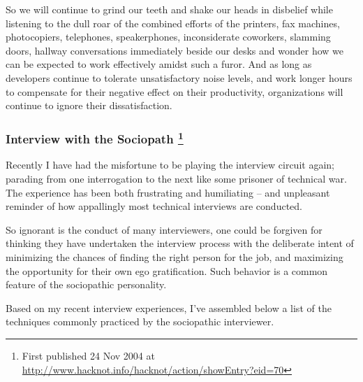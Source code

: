 \documentclass{article}
\begin{document}
\begin{enumerate}
So we will continue to grind our teeth and shake our heads in disbelief
while listening to the dull roar of the combined efforts of the
printers, fax machines, photocopiers, telephones, speakerphones,
inconsiderate coworkers, slamming doors, hallway conversations
immediately beside our desks and wonder how we can be expected to work
effectively amidst such a furor. And as long as developers continue to
tolerate unsatisfactory noise levels, and work longer hours to
compensate for their negative effect on their productivity,
organizations will continue to ignore their dissatisfaction.
\end{enumerate}

\subsubsection{Interview with the Sociopath  \footnote{First published 24 Nov 2004 at
\url{http://www.hacknot.info/hacknot/action/showEntry?eid=70}}}
\label{sec:orgheadline72}

Recently I have had the misfortune to be playing the interview circuit
again; parading from one interrogation to the next like some prisoner of
technical war. The experience has been both frustrating and humiliating
-- and unpleasant reminder of how appallingly most technical interviews
are conducted.

So ignorant is the conduct of many interviewers, one could be forgiven
for thinking they have undertaken the interview process with the
deliberate intent of minimizing the chances of finding the right person
for the job, and maximizing the opportunity for their own ego
gratification. Such behavior is a common feature of the sociopathic
personality.

Based on my recent interview experiences, I've assembled below a list of
the techniques commonly practiced by the sociopathic interviewer.
\end{document}
